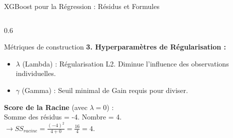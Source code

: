 \begin{frame}{XGBoost pour la Régression : Résidus et Formules}
\begin{columns}[T]
\begin{column}{0.6\textwidth}
\begin{block}{Métriques de construction}
                \textbf{3. Hyperparamètres de Régularisation :}
                \begin{itemize}
                    \setlength\itemsep{0em}
                    \item $\lambda$ (Lambda) : Régularisation L2. Diminue l'influence des observations individuelles.
                    \item $\gamma$ (Gamma) : Seuil minimal de Gain requis pour diviser.
                \end{itemize}
            \end{block}
         
            \scriptsize
            \textbf{Score de la Racine} (avec $\lambda=0$) : \\
            Somme des résidus = -4. Nombre = 4. \\
            $\rightarrow SS_{racine} = \frac{(-4)^2}{4+0} = \frac{16}{4} = 4$.
        \end{column}
    \end{columns}
\end{frame}

